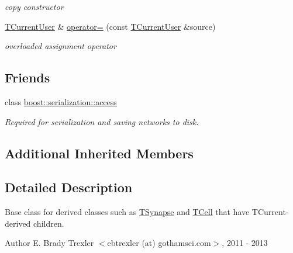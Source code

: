 \begin{DoxyCompactItemize}
\begin{DoxyCompactList}\small\item\em copy constructor \end{DoxyCompactList}\item 
\hypertarget{class_t_current_user_a35f78ca5240120864a9371a4cc61c225}{\hyperlink{class_t_current_user}{T\+Current\+User} \& \hyperlink{class_t_current_user_a35f78ca5240120864a9371a4cc61c225}{operator=} (const \hyperlink{class_t_current_user}{T\+Current\+User} \&source)}\label{class_t_current_user_a35f78ca5240120864a9371a4cc61c225}

\begin{DoxyCompactList}\small\item\em overloaded assignment operator \end{DoxyCompactList}\end{DoxyCompactItemize}
\subsection*{Friends}
\begin{DoxyCompactItemize}
\item 
\hypertarget{class_t_current_user_ac98d07dd8f7b70e16ccb9a01abf56b9c}{class \hyperlink{class_t_current_user_ac98d07dd8f7b70e16ccb9a01abf56b9c}{boost\+::serialization\+::access}}\label{class_t_current_user_ac98d07dd8f7b70e16ccb9a01abf56b9c}

\begin{DoxyCompactList}\small\item\em Required for serialization and saving networks to disk. \end{DoxyCompactList}\end{DoxyCompactItemize}
\subsection*{Additional Inherited Members}


\subsection{Detailed Description}
Base class for derived classes such as \hyperlink{class_t_synapse}{T\+Synapse} and \hyperlink{class_t_cell}{T\+Cell} that have T\+Current-\/derived children. 

\begin{DoxyAuthor}{Author}
E. Brady Trexler $<$ebtrexler (at) gothamsci.\+com$>$, 2011 -\/ 2013 
\end{DoxyAuthor}


